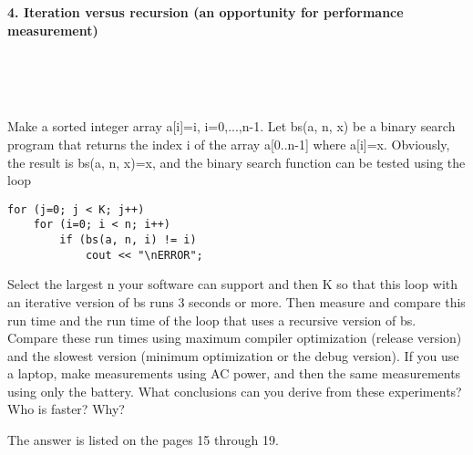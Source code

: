 \documentclass{article}
\begin{document}
\paragraph{}\	
\paragraph{}\
\paragraph{}\
\paragraph{}\

	\rmfamily
	
	\paragraph{4. Iteration versus recursion (an opportunity for performance measurement) }\
	
	\rmfamily\
	
		Make a sorted integer array a[i]=i, i=0,...,n-1.  Let bs(a, n, x) be a binary search program that returns the index i of the array a[0..n-1] where a[i]=x. Obviously, the result is bs(a, n, x)=x, and the binary search function can be tested using the loop
		
		\begin{verbatim}
for (j=0; j < K; j++)
    for (i=0; i < n; i++)
        if (bs(a, n, i) != i)
            cout << "\nERROR";
		\end{verbatim}
		
		
		Select the largest n your software can support and then K so that this loop with an iterative version of bs runs 3 seconds or more. Then measure and compare this run time and the run time of the loop that uses a recursive version of bs. Compare these run times using maximum compiler optimization (release version) and the slowest version (minimum optimization or the debug version). If you use a laptop, make measurements using AC power, and then the same measurements using only the battery. What conclusions can you derive from these experiments? Who is faster? Why?
		\newline
		
		The answer is listed on the pages 15 through 19.
	

\paragraph{}\
\end{document}
